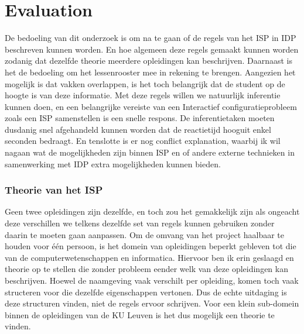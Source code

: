 \chapter{Evaluation}
\label{cha:evaluation}
De bedoeling van dit onderzoek is om na te gaan of de regels van het ISP in IDP beschreven kunnen worden. En hoe algemeen deze regels gemaakt kunnen worden zodanig dat dezelfde theorie meerdere opleidingen kan beschrijven. Daarnaast is het de bedoeling om het lessenrooster mee in rekening te brengen. Aangezien het mogelijk is dat vakken overlappen, is het toch belangrijk dat de student op de hoogte is van deze informatie. Met deze regels willen we natuurlijk inferentie kunnen doen, en een belangrijke vereiste van een Interactief configuratieprobleem zoals een ISP samenstellen is een snelle respons. De inferentietaken moeten dusdanig snel afgehandeld kunnen worden dat de reactietijd hooguit enkel seconden bedraagt. En tenslotte is er nog conflict explanation, waarbij ik wil nagaan wat de mogelijkheden zijn binnen ISP en of andere externe technieken \cite{amilhastre2002consistency} in samenwerking met IDP extra mogelijkheden kunnen bieden. 

\subsection{Theorie van het ISP}
Geen twee opleidingen zijn dezelfde, en toch zou het gemakkelijk zijn als ongeacht deze verschillen we telkens dezelfde set van regels kunnen gebruiken zonder daarin te moeten gaan aanpassen. Om de omvang van het project haalbaar te houden voor \'{e}\'{e}n persoon, is het domein van opleidingen beperkt gebleven tot die van de computerwetenschappen en informatica. Hiervoor ben ik erin geslaagd en theorie op te stellen die zonder probleem eender welk van deze opleidingen kan beschrijven. Hoewel de naamgeving vaak verschilt per opleiding, komen toch vaak structeren voor die dezelfde eigenschappen vertonen. Dus de echte uitdaging is deze structuren vinden, niet de regels ervoor schrijven. Voor een klein sub-domein binnen de opleidingen van de KU Leuven is het dus mogelijk een theorie te vinden. 


